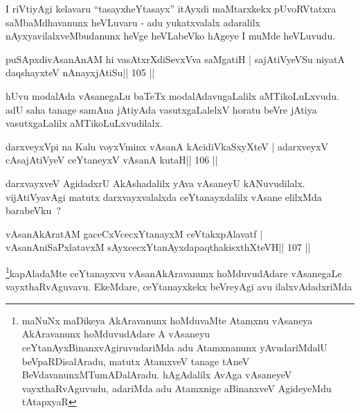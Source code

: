 \begin{artha}
I riVtiyAgi kelavaru ``tasayxheYtasayx'' itAyxdi maMtarxkekx pUvoRVtatxra saMbaMdhavanunx heVLuvaru - adu yukatxvalalx adaralilx nAyxyavilalxveMbudanunx heVge heVLabeVko hAgeye I muMde heVLuvudu.
\end{artha}



\begin{shl}
puSApxdivAsanAnAM hi vasAtxrXdiSevxVva saMgatiH |
sajAtiVyeVSu niyatA daqshayxteV nAnayxjAtiSu\hfill || 105 ||
\end{shl}

\begin{artha}
hUvu modalAda vAsanegaLu baTeTx modalAdavugaLalilx aMTikoLuLxvudu. adU
saha tanage samAna jAtiyAda vasutxgaLalelxV horatu beVre jAtiya
vasutxgaLalilx aMTikoLuLxvudilalx.
\end{artha}

\begin{shl}
darxveyxV\s pi na Kalu voyxVminx vAsanA kAcidiVkaSxyXteV |
adarxveyxV cAsajAtiVyeV ceYtaneyxV vAsanA kutaH\hfill || 106 ||
\end{shl}

\begin{artha}
darxvayxveV AgidadxrU AkAshadalilx yAva vAsaneyU kANuvudilalx.
vijAtiVyavAgi matutx darxvayxvalalxda ceYtanayxdalilx vAsane elilxMda
barabeVku~?
\end{artha}

\begin{shl}
vAsanAkAratAM gaceCxVcecxYtanayxM ceVtakxpAlavatf |
vAsanAniSaPxlatavxM sAyxcecxYtanAyxdapaqthakisxthXteVH\hfill || 107 ||
\end{shl}

\begin{artha}
\footnote{maNuNx maDikeya AkAravanunx hoMduvaMte Atamxnu vAsaneya
  AkAravanunx hoMduvudAdare A vAsaneyu ceYtanAyxBinanxvAgiruvudariMda
  adu Atamxnanunx yAvudariMdalU beVpaRDisalAradu, matutx AtamxveV
  tanage tAneV BeVdavanunxMTumADalAradu. hAgAdalilx AvAga vAsaneyeV
  vayxthaRvAguvudu, adariMda adu Atamxnige aBinanxveV AgideyeMdu tAtapxyaR}kapAladaMte ceYtanayxvu vAsanAkAravanunx hoMduvudAdare
vAsanegaLe vayxthaRvAguvavu. EkeMdare, ceYtanayxkekx beVreyAgi avu
ilalxvAdadxriMda
\end{artha}



